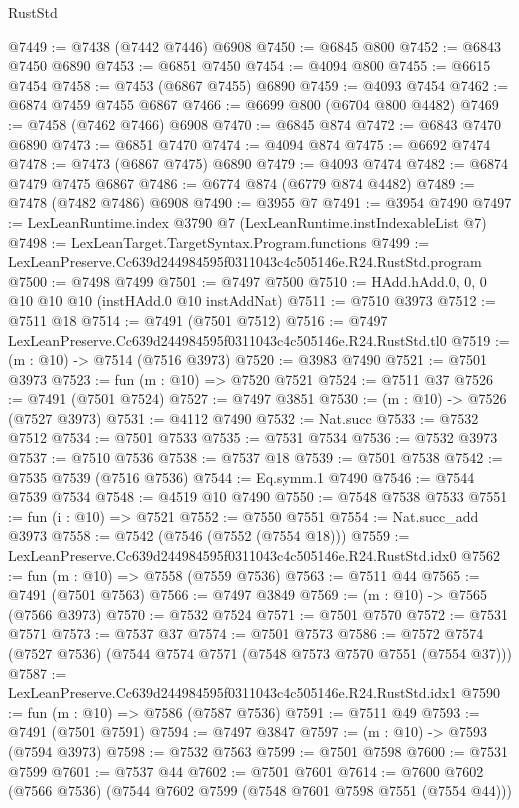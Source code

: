 \begin{lexlean}{RustStd}
\begin{coremodule}
@7449 := @7438 (@7442 @7446) @6908
@7450 := @6845 @800
@7452 := @6843 @7450 @6890
@7453 := @6851 @7450
@7454 := @4094 @800
@7455 := @6615 @7454
@7458 := @7453 (@6867 @7455) @6890
@7459 := @4093 @7454
@7462 := @6874 @7459 @7455 @6867
@7466 := @6699 @800 (@6704 @800 @4482)
@7469 := @7458 (@7462 @7466) @6908
@7470 := @6845 @874
@7472 := @6843 @7470 @6890
@7473 := @6851 @7470
@7474 := @4094 @874
@7475 := @6692 @7474
@7478 := @7473 (@6867 @7475) @6890
@7479 := @4093 @7474
@7482 := @6874 @7479 @7475 @6867
@7486 := @6774 @874 (@6779 @874 @4482)
@7489 := @7478 (@7482 @7486) @6908
@7490 := @3955 @7
@7491 := @3954 @7490
@7497 := LexLeanRuntime.index @3790 @7 (LexLeanRuntime.instIndexableList @7)
@7498 := LexLeanTarget.TargetSyntax.Program.functions
@7499 := LexLeanPreserve.Cc639d244984595f0311043c4c505146e.R24.RustStd.program
@7500 := @7498 @7499
@7501 := @7497 @7500
@7510 := HAdd.hAdd.{0, 0, 0} @10 @10 @10 (instHAdd.{0} @10 instAddNat)
@7511 := @7510 @3973
@7512 := @7511 @18
@7514 := @7491 (@7501 @7512)
@7516 := @7497 LexLeanPreserve.Cc639d244984595f0311043c4c505146e.R24.RustStd.tl0
@7519 := (m : @10) -> @7514 (@7516 @3973)
@7520 := @3983 @7490
@7521 := @7501 @3973
@7523 := fun (m : @10) => @7520 @7521
@7524 := @7511 @37
@7526 := @7491 (@7501 @7524)
@7527 := @7497 @3851
@7530 := (m : @10) -> @7526 (@7527 @3973)
@7531 := @4112 @7490
@7532 := Nat.succ
@7533 := @7532 @7512
@7534 := @7501 @7533
@7535 := @7531 @7534
@7536 := @7532 @3973
@7537 := @7510 @7536
@7538 := @7537 @18
@7539 := @7501 @7538
@7542 := @7535 @7539 (@7516 @7536)
@7544 := Eq.symm.{1} @7490
@7546 := @7544 @7539 @7534
@7548 := @4519 @10 @7490
@7550 := @7548 @7538 @7533
@7551 := fun (i : @10) => @7521
@7552 := @7550 @7551
@7554 := Nat.succ_add @3973
@7558 := @7542 (@7546 (@7552 (@7554 @18)))
@7559 := LexLeanPreserve.Cc639d244984595f0311043c4c505146e.R24.RustStd.idx0
@7562 := fun (m : @10) => @7558 (@7559 @7536)
@7563 := @7511 @44
@7565 := @7491 (@7501 @7563)
@7566 := @7497 @3849
@7569 := (m : @10) -> @7565 (@7566 @3973)
@7570 := @7532 @7524
@7571 := @7501 @7570
@7572 := @7531 @7571
@7573 := @7537 @37
@7574 := @7501 @7573
@7586 := @7572 @7574 (@7527 @7536) (@7544 @7574 @7571 (@7548 @7573 @7570 @7551 (@7554 @37)))
@7587 := LexLeanPreserve.Cc639d244984595f0311043c4c505146e.R24.RustStd.idx1
@7590 := fun (m : @10) => @7586 (@7587 @7536)
@7591 := @7511 @49
@7593 := @7491 (@7501 @7591)
@7594 := @7497 @3847
@7597 := (m : @10) -> @7593 (@7594 @3973)
@7598 := @7532 @7563
@7599 := @7501 @7598
@7600 := @7531 @7599
@7601 := @7537 @44
@7602 := @7501 @7601
@7614 := @7600 @7602 (@7566 @7536) (@7544 @7602 @7599 (@7548 @7601 @7598 @7551 (@7554 @44)))

\end{coremodule}
\end{lexlean}
